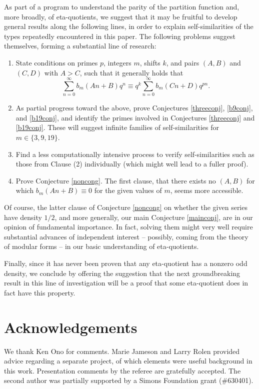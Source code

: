 \documentclass[12pt]{amsart}
\theoremstyle{definition}
\begin{document}
As part of a program to understand the parity of the partition function and, more broadly, of eta-quotients, we suggest that it may be fruitful to develop general results along the following lines, in order to explain self-similarities of the types repeatedly encountered in this paper.  The following problems suggest themselves, forming a substantial line of research:
\begin{enumerate}
\item State conditions on primes $p$, integers $m$, shifts $k$, and pairs $(A,B)$ and $(C,D)$ with $A > C$, such that it generally holds that $$\sum_{n=0}^\infty b_m(An+B) q^n \equiv q^k \sum_{n=0}^\infty b_m(C n + D) q^{pn}.$$
\item As partial progress toward the above, prove Conjectures \ref{threeconj}, \ref{b9conj}, and \ref{b19conj}, and identify the primes involved in  Conjectures \ref{threeconj} and \ref{b19conj}.  These will suggest infinite families of self-similarities for $m \in \{3, 9, 19\}$. 
\item Find a less computationally intensive process to verify self-similarities such as those from Clause (2) individually (which might well lead to a fuller proof).
\item Prove Conjecture \ref{noncong}. The first clause, that there exists no $(A,B)$ for which $b_m(An+B) \equiv 0$ for the given values of $m$, seems more accessible.
\end{enumerate}

Of course, the latter clause of Conjecture \ref{noncong} on whether the given series have density $1/2$, and more generally, our main Conjecture \ref{mainconj}, are in our opinion of fundamental importance. In fact, solving them might very well require substantial advances of independent interest -- possibly, coming from the theory of modular forms -- in our basic understanding of eta-quotients.  

Finally, since it has never been proven that any eta-quotient has a nonzero odd density, we conclude by offering the suggestion that the next groundbreaking result in this line of investigation will be a proof that some eta-quotient does in fact have this property.

\section*{Acknowledgements} We thank Ken Ono for comments. Marie Jameson and Larry Rolen provided advice regarding a separate project, of which elements were useful background in this work.  Presentation comments by the referee are gratefully accepted.  The second author was partially supported by a Simons Foundation grant (\#630401). 
\end{document}
